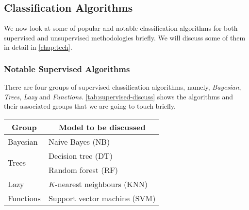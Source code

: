 \newpage
\subsection{Classification Algorithms} \label{ssec:classification-alg}
We now look at some of popular and notable classification algorithms for both supervised and unsupervised methodologies briefly. We will discuss some of them in detail in \autoref{chap:tech}.

\subsubsection{Notable Supervised Algorithms}
There are four groups of supervised classification algorithms, namely, \textit{Bayesian}, \textit{Trees}, \textit{Lazy} and \textit{Functions}. \autoref{tab:supervised-discuss} shows the algorithms and their associated groups that we are going to touch briefly. 

\parbox{\linewidth}{
  \centering
  \begin{tabular}{|l|l|}
    \hline
    \multicolumn{1}{|c|}{\textbf{Group}} & \multicolumn{1}{|c|}{\textbf{Model to be discussed}}
    \\\hline
    Bayesian & Naive Bayes (NB) 
    \\\hline
    \multirow{2}{*}{Trees} & Decision tree (DT)
    \\
    & Random forest (RF)
    \\\hline
    Lazy & $K$-nearest neighbours (KNN) 
    \\\hline
    Functions & Support vector machine (SVM)
    \\\hline
  \end{tabular}

  \label{tab:supervised-discuss}
}

